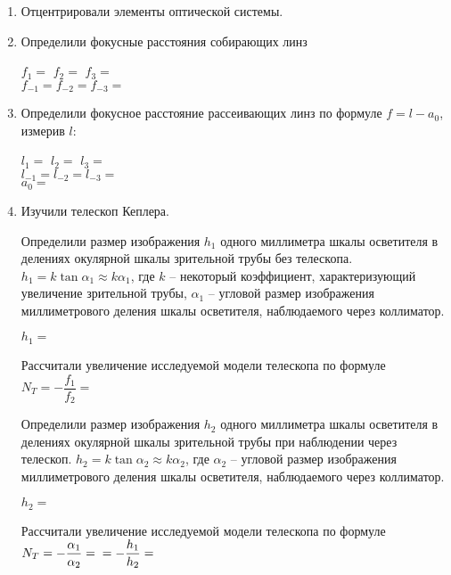 \documentclass{letask}
\begin{document}
\begin{enumerate}
\item Отцентрировали элементы оптической системы.

\item Определили фокусные расстояния собирающих линз

$f_1 = $ \hspace{1.5cm} $f_2 = $\hspace{1.5cm} $f_3 = $ \\ 
$f_{-1} = $\hspace{1.5cm}$f_{-2} = $\hspace{1.5cm}$f_{-3} = $ \\ 

\item Определили фокусное расстояние рассеивающих линз по формуле $f = l - a_0$, измерив $l$:

$l_1 = $ \hspace{1.5cm} $l_2 = $\hspace{1.5cm} $l_3 = $\\ 
$l_{-1} = $\hspace{1.5cm}$l_{-2} = $\hspace{1.5cm}$l_{-3} = $\\
$a_0 = $

\item Изучили телескоп Кеплера.

Определили размер изображения $h_1$ одного миллиметра шкалы осветителя в делениях
окулярной шкалы зрительной трубы без телескопа. $h_1 = k \tan{\alpha_1} \approx k \alpha_1$, где $k$ -- некоторый коэффициент, характеризующий увеличение зрительной трубы, $\alpha_1$ -- угловой размер изображения миллиметрового деления
шкалы осветителя, наблюдаемого через коллиматор.

$h_1 =$

Рассчитали увеличение исследуемой модели телескопа по формуле $N_T = -\dfrac{f_1}{f_2}=$


Определили размер изображения $h_2$ одного миллиметра шкалы осветителя в делениях
окулярной шкалы зрительной трубы при наблюдении через телескоп. $h_2 = k \tan{\alpha_2} \approx k \alpha_2$, где $\alpha_2$ -- угловой размер изображения миллиметрового деления
шкалы осветителя, наблюдаемого через коллиматор.

$h_2 =$

Рассчитали увеличение исследуемой модели телескопа по формуле $N_T = -\dfrac{\alpha_1}{\alpha_2}=\\=-\dfrac{h_1}{h_2} = $ 


\end{enumerate}
\end{document}
